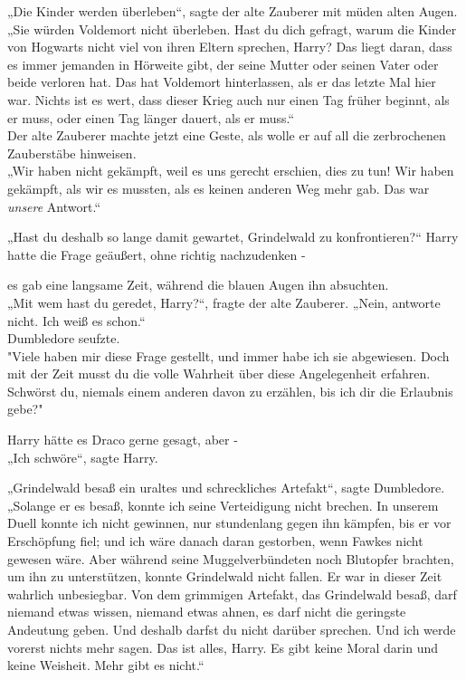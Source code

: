 {„Die Kinder werden überleben“, sagte der alte Zauberer mit müden alten Augen. „Sie würden Voldemort nicht überleben. Hast du dich gefragt, warum die Kinder von Hogwarts nicht viel von ihren Eltern sprechen, Harry? Das liegt daran, dass es immer jemanden in Hörweite gibt, der seine Mutter oder seinen Vater oder beide verloren hat. Das hat Voldemort hinterlassen, als er das letzte Mal hier war. Nichts ist es wert, dass dieser Krieg auch nur einen Tag früher beginnt, als er muss, oder einen Tag länger dauert, als er muss.“\\ Der alte Zauberer machte jetzt eine Geste, als wolle er auf all die zerbrochenen Zauberstäbe hinweisen.\\ „Wir haben nicht gekämpft, weil es uns gerecht erschien, dies zu tun! Wir haben gekämpft, als wir es mussten, als es keinen anderen Weg mehr gab. Das war \emph{unsere} Antwort.“

„Hast du deshalb so lange damit gewartet, Grindelwald zu konfrontieren?“ Harry hatte die Frage geäußert, ohne richtig nachzudenken -

es gab eine langsame Zeit, während die blauen Augen ihn absuchten.\\ „Mit wem hast du geredet, Harry?“, fragte der alte Zauberer. „Nein, antworte nicht. Ich weiß es schon.“\\ Dumbledore seufzte.\\ "Viele haben mir diese Frage gestellt, und immer habe ich sie abgewiesen. Doch mit der Zeit musst du die volle Wahrheit über diese Angelegenheit erfahren. Schwörst du, niemals einem anderen davon zu erzählen, bis ich dir die Erlaubnis gebe?"

Harry hätte es Draco gerne gesagt, aber -\\ „Ich schwöre“, sagte Harry.

„Grindelwald besaß ein uraltes und schreckliches Artefakt“, sagte Dumbledore. „Solange er es besaß, konnte ich seine Verteidigung nicht brechen. In unserem Duell konnte ich nicht gewinnen, nur stundenlang gegen ihn kämpfen, bis er vor Erschöpfung fiel; und ich wäre danach daran gestorben, wenn Fawkes nicht gewesen wäre. Aber während seine Muggelverbündeten noch Blutopfer brachten, um ihn zu unterstützen, konnte Grindelwald nicht fallen. Er war in dieser Zeit wahrlich unbesiegbar. Von dem grimmigen Artefakt, das Grindelwald besaß, darf niemand etwas wissen, niemand etwas ahnen, es darf nicht die geringste Andeutung geben. Und deshalb darfst du nicht darüber sprechen. Und ich werde vorerst nichts mehr sagen. Das ist alles, Harry. Es gibt keine Moral darin und keine Weisheit. Mehr gibt es nicht.“

}
